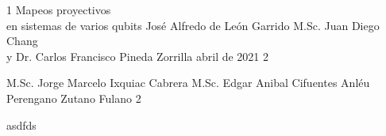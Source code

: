 \documentclass[letterpaper,12pt]{thesisECFM}
\theoremstyle{plain}
\theoremstyle{definition}
\theoremstyle{remark}
\newcommand{\1}{\mathbb{1}}
\begin{document}
\datosThesis%
{1}%
{Mapeos proyectivos\\en sistemas de varios qubits}%
{José Alfredo de León Garrido}%
{M.Sc. Juan Diego Chang\\y Dr. Carlos Francisco
Pineda Zorrilla}%
{abril de 2021}		%
{2}							%

\examenPrivado%
{M.Sc. Jorge Marcelo Ixquiac Cabrera}%
{M.Sc. Edgar Anibal Cifuentes Anléu}%
{Perengano}%
{Zutano}%
{Fulano 2}%

{\onehalfspacing	%



asdfds
\par}
 
\frontmatter    %

{\onehalfspacing	%

\tableofcontents    %





\mainmatter     %





{\backmatter     %




}


%

\par}               %
\end{document}
